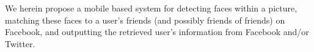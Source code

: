 We herein propose a mobile based system for detecting faces within a
picture, matching these faces to a user's friends (and possibly
friends of friends) on Facebook, and outputting the retrieved user's
information from Facebook and/or Twitter.
